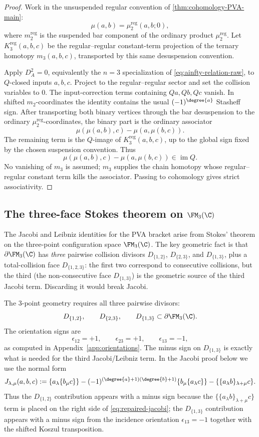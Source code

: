 \begin{proof}
Work in the unsuspended regular convention of
\cref{thm:cohomology-PVA-main}:
\[
\mu(a,b)=\mu_2^{\mathrm{reg}}(a,b;0),
\]
where \(m_2^{\mathrm{reg}}\) is the suspended bar component of the
ordinary product \(\mu_2^{\mathrm{reg}}\). Let
\(K_3^{\mathrm{reg}}(a,b,c)\) be the regular--regular constant-term
projection of the ternary homotopy \(m_3(a,b,c)\), transported by this
same desuspension convention.

Apply \(D_A^2=0\), equivalently the \(n=3\) specialization of
\eqref{eq:ainfty-relation-raw}, to \(Q\)-closed inputs \(a,b,c\).
Project to the regular--regular sector and set the collision variables
to \(0\). The input-correction terms containing \(Qa,Qb,Qc\) vanish.
In shifted \(m_2\)-coordinates the identity contains the usual
\((-1)^{\degree{a}}\) Stasheff sign. After transporting both binary
vertices through the bar desuspension to the ordinary
\(\mu_2^{\mathrm{reg}}\)-coordinates, the binary part is the ordinary
associator
\[
\mu(\mu(a,b),c)-\mu(a,\mu(b,c)).
\]
The remaining term is the \(Q\)-image of
\(K_3^{\mathrm{reg}}(a,b,c)\), up to the global sign fixed by the
chosen suspension convention. Thus
\[
\mu(\mu(a,b),c)-\mu(a,\mu(b,c))\in \operatorname{im}Q .
\]
No vanishing of \(m_3\) is assumed; \(m_3\) supplies the chain homotopy
whose regular--regular constant term kills the associator. Passing to
cohomology gives strict associativity.
\end{proof}

\subsection{The three-face Stokes theorem on $\FM_3(\C)$}
\label{subsec:three-face-stokes}

The Jacobi and Leibniz identities for the PVA bracket arise from
Stokes' theorem on the three-point configuration space $\FM_3(\C)$.
The key geometric fact is that $\partial\FM_3(\C)$ has \emph{three}
pairwise collision divisors $D_{\{1,2\}}$, $D_{\{2,3\}}$, and
$D_{\{1,3\}}$, plus a total-collision face $D_{\{1,2,3\}}$: the
first two correspond to consecutive collisions, but the third
(the non-consecutive face $D_{\{1,3\}}$) is the geometric
source of the third Jacobi term. Discarding it would break Jacobi.

The $3$-point geometry requires all three pairwise divisors:
\[
D_{\{1,2\}},\qquad D_{\{2,3\}},\qquad D_{\{1,3\}}\subset \partial\FM_3(\C).
\]
The orientation signs are
\[
\epsilon_{12}=+1,\qquad \epsilon_{23}=+1,\qquad \epsilon_{13}=-1,
\]
as computed in Appendix~\ref{app:orientations}. The minus sign on $D_{\{1,3\}}$
is exactly what is needed for the third Jacobi/Leibniz term.
In the Jacobi proof below we use the normal form
\[
J_{\lambda,\mu}(a,b,c)
:=
\{a_\lambda\{b_\mu c\}\}
-
(-1)^{(\degree{a}+1)(\degree{b}+1)}
\{b_\mu\{a_\lambda c\}\}
-
\{\{a_\lambda b\}_{\lambda+\mu}c\}.
\]
Thus the \(D_{\{1,2\}}\) contribution appears with a minus sign because
the \(\{\{a_\lambda b\}_{\lambda+\mu}c\}\) term is placed on the right
side of \eqref{eq:repaired-jacobi}; the \(D_{\{1,3\}}\) contribution
appears with a minus sign from the incidence orientation
\(\epsilon_{13}=-1\) together with the shifted Koszul transposition.

